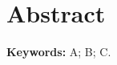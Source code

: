 \section*{\centering Abstract}

\lipsum[4]

\vspace{1cm}

\noindent \textbf{Keywords:} A; B; C.
\pagebreak